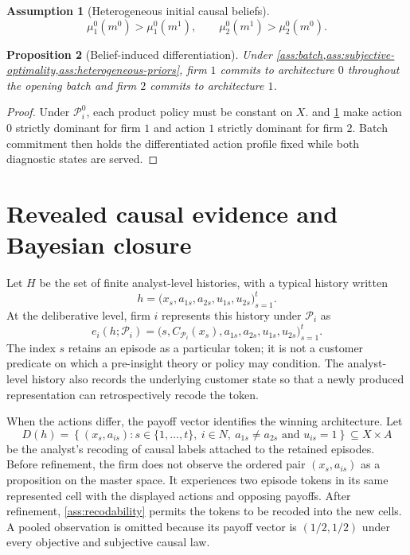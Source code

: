 \documentclass[11pt]{article}
\newtheorem{assumption}{Assumption}[section]
\newtheorem{proposition}[assumption]{Proposition}
\begin{document}
\begin{assumption}[Heterogeneous initial causal beliefs]
\label{ass:heterogeneous-priors}
\[
\mu_1^0(m^0)>\mu_1^0(m^1),
\qquad
\mu_2^0(m^1)>\mu_2^0(m^0).
\]
\end{assumption}

\begin{proposition}[Belief-induced differentiation]
\label{prop:initial-differentiation}
Under \cref{ass:batch,ass:subjective-optimality,ass:heterogeneous-priors}, firm $1$ commits to
architecture $0$ throughout the opening batch and firm $2$ commits to
architecture $1$.
\end{proposition}

\begin{proof}
Under $\mathcal P_i^0$, each product policy must be constant on $X$.
 and \cref{ass:heterogeneous-priors} make action $0$
strictly dominant for firm $1$ and action $1$ strictly dominant for firm $2$.
Batch commitment then holds the differentiated action profile fixed while both
diagnostic states are served.
\end{proof}

\section{Revealed causal evidence and Bayesian closure}

Let $H$ be the set of finite analyst-level histories, with a typical history
written
\[
h=\big(x_s,a_{1s},a_{2s},u_{1s},u_{2s}\big)_{s=1}^{t}.
\]
At the deliberative level, firm $i$ represents this history under
$\mathcal P_i$ as
\begin{equation}
e_i(h;\mathcal P_i)
=
\big(s,C_{\mathcal P_i}(x_s),a_{1s},a_{2s},u_{1s},u_{2s}\big)_{s=1}^{t}.
\label{eq:deliberative-record}
\end{equation}
The index $s$ retains an episode as a particular token; it is not a customer
predicate on which a pre-insight theory or policy may condition.  The
analyst-level history also records the underlying customer state so that a
newly produced representation can retrospectively recode the token.

When the actions differ, the payoff vector identifies the winning architecture.
Let
\begin{equation}
D(h)
=
\left\{
(x_s,a_{is}):
s\in\{1,\ldots,t\},\ i\in N,\
a_{1s}\neq a_{2s}\text{ and }u_{is}=1
\right\}
\subseteq X\times A
\label{eq:revealed-data}
\end{equation}
be the analyst's recoding of causal labels attached to the retained episodes.
Before refinement, the firm does not observe the ordered pair $(x_s,a_{is})$ as
a proposition on the master space.  It experiences two episode tokens in its
same represented cell with the displayed actions and opposing payoffs.  After
refinement, \cref{ass:recodability} permits the tokens to be recoded into the
new cells.  A pooled observation is omitted because its payoff vector is
$(1/2,1/2)$ under every objective and subjective causal law.
\end{document}
